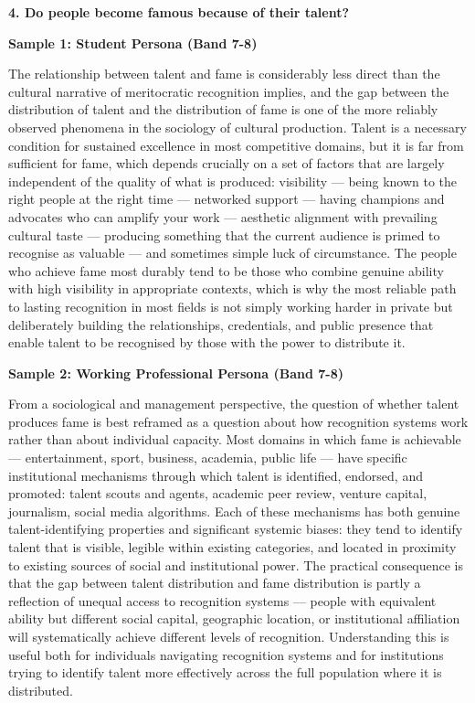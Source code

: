 \separator

\begin{ieltsquestion}
\textbf{4. Do people become famous because of their talent?}
\end{ieltsquestion}
\textbf{Sample 1: Student Persona (Band 7-8)}

The relationship between talent and fame is considerably less direct than the cultural narrative of meritocratic recognition implies, and the gap between the distribution of talent and the distribution of fame is one of the more reliably observed phenomena in the sociology of cultural production. Talent is a necessary condition for sustained excellence in most competitive domains, but it is far from sufficient for fame, which depends crucially on a set of factors that are largely independent of the quality of what is produced: visibility — being known to the right people at the right time — networked support — having champions and advocates who can amplify your work — aesthetic alignment with prevailing cultural taste — producing something that the current audience is primed to recognise as valuable — and sometimes simple luck of circumstance. The people who achieve fame most durably tend to be those who combine genuine ability with high visibility in appropriate contexts, which is why the most reliable path to lasting recognition in most fields is not simply working harder in private but deliberately building the relationships, credentials, and public presence that enable talent to be recognised by those with the power to distribute it.

\textbf{Sample 2: Working Professional Persona (Band 7-8)}

From a sociological and management perspective, the question of whether talent produces fame is best reframed as a question about how recognition systems work rather than about individual capacity. Most domains in which fame is achievable — entertainment, sport, business, academia, public life — have specific institutional mechanisms through which talent is identified, endorsed, and promoted: talent scouts and agents, academic peer review, venture capital, journalism, social media algorithms. Each of these mechanisms has both genuine talent-identifying properties and significant systemic biases: they tend to identify talent that is visible, legible within existing categories, and located in proximity to existing sources of social and institutional power. The practical consequence is that the gap between talent distribution and fame distribution is partly a reflection of unequal access to recognition systems — people with equivalent ability but different social capital, geographic location, or institutional affiliation will systematically achieve different levels of recognition. Understanding this is useful both for individuals navigating recognition systems and for institutions trying to identify talent more effectively across the full population where it is distributed.

